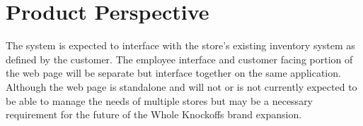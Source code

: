 \documentclass{scrreprt}
\theoremstyle{funreq}
\begin{document}
\section{Product Perspective}
The system is expected to interface with the store's existing inventory system as defined by the customer. The employee interface and customer facing portion of the web page will be separate but interface together on the same application. Although the web page is standalone and will not or is not currently expected to be able to manage the needs of multiple stores but may be a necessary requirement for the future of the Whole Knockoffs brand expansion. %
\end{document}
